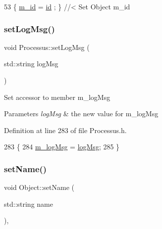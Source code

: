 \begin{DoxyCode}
53 \{ \hyperlink{classObject_aca74b9dbfed7b5556ea2d56c65b6b6b0}{m\_id}    = \hyperlink{classObject_af99145335cc61ff6e2798ea17db009d2}{id}    ; \} \textcolor{comment}{//< Set Object m\_id}
\end{DoxyCode}
\mbox{\label{classProcessus_a471833f89047aa9a7ff6200a31c17a1d}} 
\subsubsection{\texorpdfstring{set\+Log\+Msg()}{setLogMsg()}}
{\footnotesize\ttfamily void Processus\+::set\+Log\+Msg (\begin{DoxyParamCaption}\item[{std\+::string}]{log\+Msg }\end{DoxyParamCaption})\hspace{0.3cm}{\ttfamily [inline]}}

Set accessor to member m\+\_\+log\+Msg 
\begin{DoxyParams}{Parameters}
{\em log\+Msg} & the new value for m\+\_\+log\+Msg \\
\hline
\end{DoxyParams}


Definition at line 283 of file Processus.\+h.


\begin{DoxyCode}
283                                     \{
284     \hyperlink{classProcessus_a3bc0140a3a69a83951ab7f9986bd2c84}{m\_logMsg} = \hyperlink{classProcessus_a42fdeb17dc13ba854222666b6aa29b61}{logMsg};
285   \}
\end{DoxyCode}
\mbox{\label{classObject_ae30fea75683c2d149b6b6d17c09ecd0c}} 
\subsubsection{\texorpdfstring{set\+Name()}{setName()}}
{\footnotesize\ttfamily void Object\+::set\+Name (\begin{DoxyParamCaption}\item[{std\+::string}]{name }\end{DoxyParamCaption})\hspace{0.3cm}{\ttfamily [inline]}, {\ttfamily [inherited]}}



